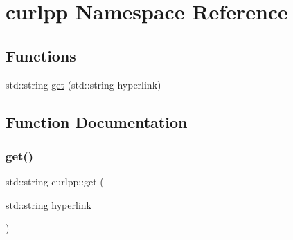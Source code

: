 \hypertarget{a00041}{}\section{curlpp Namespace Reference}
\label{a00041}
\subsection*{Functions}
\begin{DoxyCompactItemize}
\item 
std\+::string \hyperlink{a00041_acbba0862979b2ae3a4d2a73369f42820}{get} (std\+::string hyperlink)
\end{DoxyCompactItemize}


\subsection{Function Documentation}
\mbox{\label{a00041_acbba0862979b2ae3a4d2a73369f42820}} 
\subsubsection{\texorpdfstring{get()}{get()}}
{\footnotesize\ttfamily std\+::string curlpp\+::get (\begin{DoxyParamCaption}\item[{std\+::string}]{hyperlink }\end{DoxyParamCaption})}

